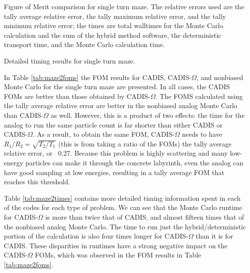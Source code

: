 \begin{table}[h!]
  \centering
  
  \caption[Figure of Merit comparison for single turn maze.]{Figure of Merit
    comparison for single turn maze.
    The relative errors used are the tally average relative error, the tally maximum relative
  error, and the tally minimum relative error; the times are total walltimes for
  the Monte Carlo calculation and the sum of the hybrid method software, the
  deterministic transport time, and the Monte Carlo calculation time.}
  \label{tab:maze2foms}
\end{table}

\begin{table}[h!]
  \centering
  
  \caption[Detailed timing results for single turn maze.]
  {Detailed timing results for single turn maze.}
  \label{tab:maze2times}
\end{table}

In Table \ref{tab:maze2foms} the FOM results for CADIS, CADIS-$\Omega$, and
nonbiased Monte Carlo for the single turn maze are presented. In all cases, the
CADIS FOMs are better than those obtained by CADIS-$\Omega$. The FOMS
calculated using the tally average relative error are better in the nonbiased
analog Monte Carlo than CADIS-$\Omega$ as well. However, this is a product of
two effects: the time for the analog to run the same particle count is far
shorter than either CADIS or CADIS-$\Omega$. As a result, to obtain the same
FOM, CADIS-$\Omega$ needs to have $R_1/R_2 = \sqrt{T_2/T_1}$ (this is from
taking a ratio of the FOMs) the tally average
relative error, or ~$0.27$. Because this problem is highly scattering and many
low-energy particles can make it through the concrete labyrinth, even the analog
can have good sampling at low energies, resulting in a tally average FOM that
reaches this threshold.

Table \ref{tab:maze2times} contains more detailed timing information spent in
each of the codes for each type of problem. We can see that the Monte Carlo
runtime for CADIS-$\Omega$ is more than twice that of CADIS, and almost fifteen
times that of the nonbiased analog Monte Carlo. The time to run just the
hybrid/deterministic portion of the calculation is also four times longer for
CADIS-$\Omega$ than it is for CADIS. These disparities in runtimes have a strong
negative impact on the CADIS-$\Omega$ FOMs, which was observed in the FOM
results in Table \ref{tab:maze2foms}.


